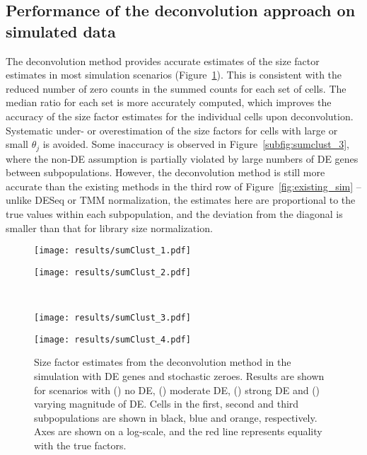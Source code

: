 \documentclass{article}
\begin{document}
\subsection{Performance of the deconvolution approach on simulated data}
The deconvolution method provides accurate estimates of the size factor estimates in most simulation scenarios (Figure~\ref{fig:sim_cluster_DE}).
This is consistent with the reduced number of zero counts in the summed counts for each set of cells.
The median ratio for each set is more accurately computed, which improves the accuracy of the size factor estimates for the individual cells upon deconvolution.
Systematic under- or overestimation of the size factors for cells with large or small $\theta_j$ is avoided.
Some inaccuracy is observed in Figure~\ref{subfig:sumclust_3}, where the non-DE assumption is partially violated by large numbers of DE genes between subpopulations.
However, the deconvolution method is still more accurate than the existing methods in the third row of Figure~\ref{fig:existing_sim}
    -- unlike DESeq or TMM normalization, the estimates here are proportional to the true values within each subpopulation, 
       and the deviation from the diagonal is smaller than that for library size normalization.

\begin{figure}[btp]
\begin{minipage}{0.48\textwidth}
    \texttt{[image: results/sumClust\_1.pdf]}
    \subcaption{}\label{subfig:sumclust_1}
\end{minipage}
\begin{minipage}{0.48\textwidth}
    \texttt{[image: results/sumClust\_2.pdf]}
    \subcaption{}\label{subfig:sumclust_2}
\end{minipage}  \\ 
\begin{minipage}{0.48\textwidth}
    \texttt{[image: results/sumClust\_3.pdf]}
    \subcaption{}\label{subfig:sumclust_3}
\end{minipage}
\begin{minipage}{0.48\textwidth}
    \texttt{[image: results/sumClust\_4.pdf]}
    \subcaption{}\label{subfig:sumclust_4}
\end{minipage}
    \caption{
        Size factor estimates from the deconvolution method in the simulation with DE genes and stochastic zeroes.
        Results are shown for scenarios with () no DE, () moderate DE, 
                () strong DE and () varying magnitude of DE.
        Cells in the first, second and third subpopulations are shown in black, blue and orange, respectively.
        Axes are shown on a log-scale, and the red line represents equality with the true factors.
    }
    \label{fig:sim_cluster_DE}
\end{figure}
\end{document}
